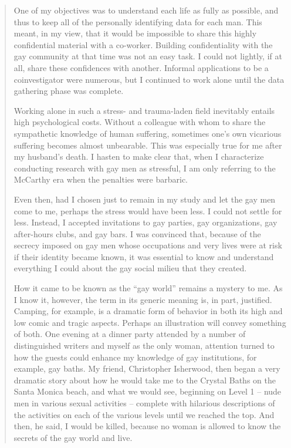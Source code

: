\begin{refsection}
\begin{quote}
One of my objectives was to understand each life as fully as possible, and thus to keep all of the personally identifying data for each man. This meant, in my view, that it would be impossible to share this highly confidential material with a co-worker. Building confidentiality with the gay community at that time was not an easy task. I could not lightly, if at all, share these confidences with another. Informal applications to be a coinvestigator were numerous, but I continued to work alone until the data gathering phase was complete.

Working alone in such a stress- and trauma-laden field inevitably entails high psychological costs. Without a colleague with whom to share the sympathetic knowledge of human suffering, sometimes one's own vicarious suffering becomes almost unbearable. This was especially true for me after my husband's death. I hasten to make clear that, when I characterize conducting research with gay men as stressful, I am only referring to the McCarthy era when the penalties were barbaric.

Even then, had I chosen just to remain in my study and let the gay men come to me, perhaps the stress would have been less. I could not settle for less. Instead, I accepted invitations to gay parties, gay organizations, gay after-hours clubs, and gay bars. I was convinced that, because of the secrecy imposed on gay men whose occupations and very lives were at risk if their identity became known, it was essential to know and understand everything I could about the gay social milieu that they created.

How it came to be known as the ``gay world'' remains a mystery to me. As I know it, however, the term in its generic meaning is, in part, justified. Camping, for example, is a dramatic form of behavior in both its high and low comic and tragic aspects. Perhaps an illustration will convey something of both. One evening at a dinner party attended by a number of distinguished writers and myself as the only woman, attention turned to how the guests could enhance my knowledge of gay institutions, for example, gay baths. My friend, Christopher Isherwood, then began a very dramatic story about how he would take me to the Crystal Baths on the Santa Monica beach, and what we would see, beginning on Level 1 – nude men in various sexual activities – complete with hilarious descriptions of the activities on each of the various levels until we reached the top. And then, he said, I would be killed, because no woman is allowed to know the secrets of the gay world and live.


\end{quote}
\end{refsection}
